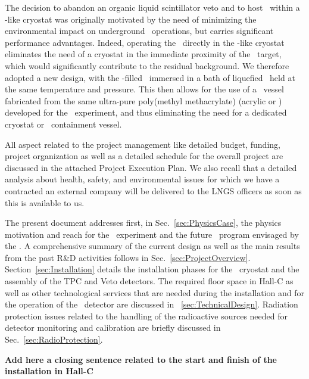 The decision to abandon an organic liquid scintillator veto and to host \DSks\ within a \pDUNE-like cryostat was originally motivated by the need of minimizing the environmental impact on underground \LNGS\ operations, but carries significant performance advantages.  Indeed, operating the \TPC\ directly in the \pDUNE-like cryostat eliminates the need of a cryostat in the immediate proximity of the \UAr\ target, which would significantly contribute to the residual background.  We therefore adopted a new design, with the \UAr-filled \TPC\  immersed in a bath of liquefied \AAr\ held at the same temperature and pressure.  This then allows for the use of a \TPC\ vessel fabricated from the same ultra-pure poly(methyl methacrylate) (acrylic or \PMMA) developed for the \DEAP\ experiment, and thus eliminating the need for a dedicated cryostat or \UAr\ containment vessel. 


All aspect related to the project management like detailed budget, funding, project organization as well as a detailed schedule for the overall project are discussed in the attached Project Execution Plan. We also recall that a detailed analysis about health, safety, and environmental issues for which we have a contracted an external company will be delivered to the LNGS officers as soon as this is available to us.

The present document addresses first, in Sec.~\ref{sec:PhysicsCase}, the physics motivation and reach for the \DSks\ experiment and the future \LAr\ program envisaged by the \GADMC.  A comprehensive summary of the current design as well as the main results from the past R\&D activities follows in Sec.~\ref{sec:ProjectOverview}. Section~\ref{sec:Installation} details the installation phases for the \AAr\ cryostat and the assembly of the TPC and Veto detectors. The required floor space in Hall-C as well as other technological services that are needed during the installation and for the operation of the \DSks\ detector are discussed in ~\ref{sec:TechnicalDesign}. Radiation protection issues related to the handling of the radioactive sources needed for detector monitoring and calibration are briefly discussed in Sec.~\ref{sec:RadioProtection}. 

{\bf Add here a closing sentence related to the start and finish of the installation in Hall-C}

